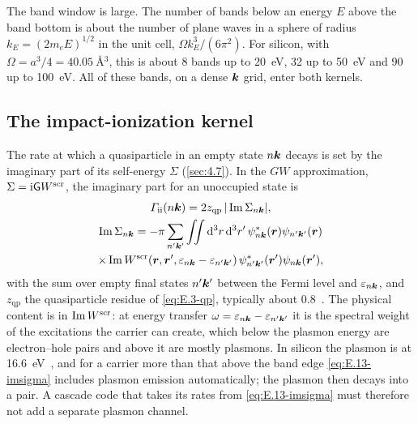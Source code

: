 The band window is large. The number of bands below an energy $E$ above the band bottom is about the number of plane waves in a sphere of radius $k_E = (2m_eE)^{1/2}$ in the unit cell, $\Omega k_E^3/(6\pi^2)$. For silicon, with $\Omega = a^3/4 = \SI{40.05}{\angstrom^3}$, this is about 8 bands up to \SI{20}{eV}, 32 up to \SI{50}{eV} and 90 up to \SI{100}{eV}. All of these bands, on a dense $\bm{k}$ grid, enter both kernels.

\subsection{The impact-ionization kernel}

The rate at which a quasiparticle in an empty state $n\bm{k}$ decays is set by the imaginary part of its self-energy $\Sigma$ (\cref{sec:4.7}). In the $GW$ approximation, $\Sigma = \mathrm{i}\mathsf{G} W^{\mathrm{scr}}$, the imaginary part for an unoccupied state is~\cite[Eqs.~(1)--(2)]{kotani2010impact}
\begin{gather}
  \varGamma_{\mathrm{ii}}(n\bm{k}) = 2z_{\mathrm{qp}}\,|\operatorname{Im}\Sigma_{n\bm{k}}|, \nonumber\\
  \operatorname{Im}\Sigma_{n\bm{k}} = -\pi\sum_{n'\bm{k}'}\iint\mathrm{d}^3r\,\mathrm{d}^3r'\,
  \psi^*_{n\bm{k}}(\bm{r})\psi_{n'\bm{k}'}(\bm{r})\nonumber\\
  \times\operatorname{Im} W^{\mathrm{scr}}(\bm{r}, \bm{r}', \varepsilon_{n\bm{k}} - \varepsilon_{n'\bm{k}'})\,
  \psi^*_{n'\bm{k}'}(\bm{r}')\psi_{n\bm{k}}(\bm{r}'),
  \label{eq:E.13-imsigma}
\end{gather}
with the sum over empty final states $n'\bm{k}'$ between the Fermi level and $\varepsilon_{n\bm{k}}$, and $z_{\mathrm{qp}}$ the quasiparticle residue of \cref{eq:E.3-qp}, typically about 0.8~\cite[Sect.~II]{kotani2010impact}. The physical content is in $\operatorname{Im} W^{\mathrm{scr}}$: at energy transfer $\omega = \varepsilon_{n\bm{k}} - \varepsilon_{n'\bm{k}'}$ it is the spectral weight of the excitations the carrier can create, which below the plasmon energy are electron--hole pairs and above it are mostly plasmons. In silicon the plasmon is at \SI{16.6}{eV}~\cite[Table~I]{ramanathan2020ionization}, and for a carrier more than that above the band edge \cref{eq:E.13-imsigma} includes plasmon emission automatically; the plasmon then decays into a pair. A cascade code that takes its rates from \cref{eq:E.13-imsigma} must therefore not add a separate plasmon channel.

